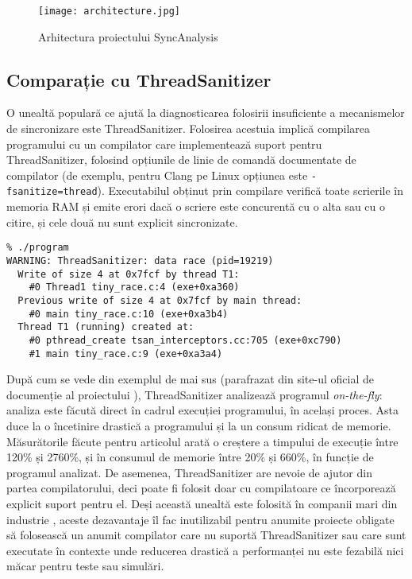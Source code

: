 \begin{figure}[ht]
\centering
\texttt{[image: architecture.jpg]}
\caption{Arhitectura proiectului SyncAnalysis}
\label{fig:architecture}
\end{figure}

\subsection{Comparație cu ThreadSanitizer}
O unealtă populară ce ajută la diagnosticarea folosirii insuficiente a
mecanismelor de sincronizare este ThreadSanitizer\cite{ThreadSanitizer}.
Folosirea acestuia implică compilarea programului cu un compilator care
implementează suport pentru ThreadSanitizer, folosind opțiunile de linie
de comandă documentate de compilator (de exemplu, pentru Clang pe Linux
opțiunea este \lstinline{-fsanitize=thread}). Executabilul obținut prin
compilare verifică toate scrierile în memoria RAM și emite erori dacă
o scriere este concurentă cu o alta sau cu o citire, și cele două nu
sunt explicit sincronizate.

\begin{lstlisting}[caption=Exemplu de folosire ThreadSanitizer]
% clang -fsanitize=thread -g -O1 -o program tiny_race.c
% ./program
WARNING: ThreadSanitizer: data race (pid=19219)
  Write of size 4 at 0x7fcf by thread T1:
    #0 Thread1 tiny_race.c:4 (exe+0xa360)
  Previous write of size 4 at 0x7fcf by main thread:
    #0 main tiny_race.c:10 (exe+0xa3b4)
  Thread T1 (running) created at:
    #0 pthread_create tsan_interceptors.cc:705 (exe+0xc790)
    #1 main tiny_race.c:9 (exe+0xa3a4)
\end{lstlisting}

După cum se vede din exemplul de mai sus (parafrazat din site-ul oficial
de documenție al proiectului \cite{ThreadSanitizerDoc}), ThreadSanitizer
analizează programul \textit{on-the-fly}: analiza este făcută direct în
cadrul execuției programului, în același proces. Asta duce la o
încetinire drastică a programului și la un consum ridicat de memorie.
Măsurătorile făcute pentru articolul \cite{ThreadSanitizer} arată o
creștere a timpului de execuție între 120\% și 2760\%, și în consumul de
memorie între 20\% și 660\%, în funcție de programul analizat. De
asemenea, ThreadSanitizer are nevoie de ajutor din partea
compilatorului, deci poate fi folosit doar cu compilatoare ce
încorporează explicit suport pentru el. Deși această unealtă este
folosită în companii mari din industrie \cite{ThreadSanitizer}, aceste
dezavantaje îl fac inutilizabil pentru anumite proiecte obligate să
folosească un anumit compilator care nu suportă ThreadSanitizer sau
care sunt executate în contexte unde reducerea drastică a performanței
nu este fezabilă nici măcar pentru teste sau simulări.


